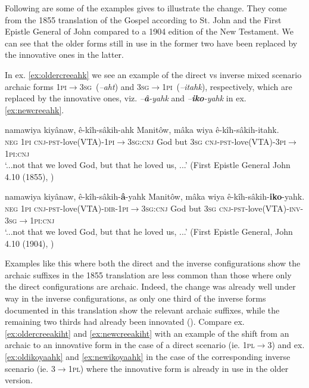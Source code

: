 \documentclass[twoside,a4paper,11pt]{article}
\newcommand{\ipa}[1]{{\phon\textit{#1}}}
\newcommand{\sg}{\textsc{sg}}
\newcommand{\pl}{\textsc{pl}}
\newcommand{\cnj}{\textsc{cnj}}
\newcommand{\dir}{\textsc{dir}}
\newcommand{\inv}{\textsc{inv}}
\newcommand{\negat}{\textsc{neg}}
\newcommand{\pli}{\textsc{pi}}
\newcommand{\pst}{\textsc{pst}}
\begin{document}
Following are some of the examples  \citealt{dahlstrom89change} gives to illustrate the change. They come from the 1855 translation of the Gospel according to St. John and the First Epistle General of John compared to a 1904 edition of the New Testament. We can see that the older forms still in use in the former two have been replaced by the innovative ones in the latter.

In ex. \ref{ex:oldercreeahk} we see an example of the direct vs inverse mixed scenario archaic forms 1\pli$\rightarrow$3\sg\ (\ipa{--aht}) and 3\sg$\rightarrow$1\pli\ (\ipa{--itahk}), respectively, which are replaced by the innovative ones, viz. \ipa{--\textbf{â}-yahk} and \ipa{--\textbf{iko}-yahk} in ex. \ref{ex:newcreeahk}.
\begin{exe}
\ex 
\begin{xlist}
\ex \label{ex:oldercreeahk}
\gll namawiya kiyânaw, ê-kîh-sâkih-ahk Manitôw, mâka wiya ê-kîh-sâkih-itahk.\\
{\negat} {1\pli} {\cnj-\pst-love(VTA)-1\pli$\rightarrow$3\sg:\cnj} God {but} {3\sg} {\cnj-\pst-love(VTA)-3\pli$\rightarrow$1\pli:\cnj}\\
\glt `...not that we loved God, but that he loved us, ...' (First Epistle General John 4.10 (1855), \citealt[p. 3]{dahlstrom89change})


\ex \label{ex:newcreeahk}
\gll namawiya kiyânaw, ê-kîh-sâkih-\textbf{â}-yahk Manitôw, mâka wiya ê-kîh-sâkih-\textbf{iko}-yahk.\\
{\negat} {1\pli} {\cnj-\pst-love(VTA)-\dir-1\pli$\rightarrow$3\sg:\cnj} God {but} {3\sg} {\cnj-\pst-love(VTA)-\inv-3\sg$\rightarrow$1\pli:\cnj}\\
\glt `...not that we loved God, but that he loved us, ...' (First Epistle General, John 4.10 (1904), \citealt[p. 3]{dahlstrom89change})
\end{xlist}
\end{exe}

Examples like this where both the direct and the inverse configurations show the archaic suffixes in the 1855 translation are less common than those where only the direct configurations are archaic. Indeed, the change was already well under way in the inverse configurations, as only one third of the inverse forms documented in this translation show the relevant archaic suffixes, while the remaining two thirds had already been innovated (\citealt[p. 3]{dahlstrom89change}). Compare ex. \ref{ex:oldercreeakiht} and \ref{ex:newcreeakiht} with an example of the shift from an archaic to an innovative form in the case of a direct scenario (ie. 1\pl$\rightarrow$3) and ex. \ref{ex:oldikoyaahk} and \ref{ex:newikoyaahk} in the case of the corresponding inverse scenario (ie. 3$\rightarrow$1\pl) where the innovative form is already in use in the older version.
\end{document}
